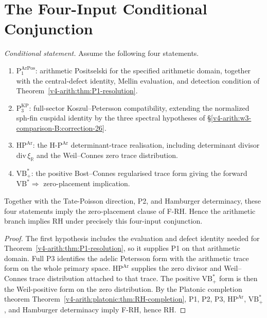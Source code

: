\section{The Four-Input Conditional Conjunction}
\label{v4-arith:w3-comparison-B:four-input-branch}

\begin{theorem}
\label{v4-arith:w3-comparison-B:thm:four-input-branch}
\emph{Conditional statement.} Assume the following four
statements.
\begin{enumerate}
\item \(\mathrm{P}_{1}^{\mathrm{ArPos}}\): arithmetic Positselski for
the specified arithmetic domain, together with the central-defect
identity, Mellin evaluation, and detection condition of
Theorem~\ref{v4-arith:thm:P1-resolution}.
\item \(\mathrm{P}_{3}^{\mathrm{KP}}\): full-sector
Koszul--Petersson compatibility, extending the normalized sph-fin
cuspidal identity by the three spectral hypotheses of
\S\ref{v4-arith:w3-comparison-B:correction-26}.
\item \(\mathrm{HP}^{\mathrm{Ar}}\): the
\(\mathrm{H}\text{-}\mathrm{P}^{\mathrm{Ar}}\) determinant-trace realisation,
including determinant divisor \(\mathrm{div}\,\xi_{\mathbb R}\) and
the Weil--Connes zero trace distribution.
\item \(\mathrm{VB}^{*}_{+}\): the positive Bost--Connes
regularised trace form giving the forward
\(\mathrm{VB}^{*}\Rightarrow\) zero-placement implication.
\end{enumerate}
Together with the Tate-Poisson direction, P2, and Hamburger
determinacy, these four statements imply the zero-placement clause of
F-RH.  Hence the arithmetic branch implies RH under precisely this
four-input conjunction.
\end{theorem}

\begin{proof}
The first hypothesis includes the evaluation and defect identity
needed for Theorem~\ref{v4-arith:thm:P1-resolution}, so it supplies
P1 on that arithmetic domain.  Full P3 identifies the adelic
Petersson form with the arithmetic trace form on the whole primary
space.  \(\mathrm{HP}^{\mathrm{Ar}}\) supplies the zero divisor and
Weil--Connes trace distribution attached to that trace.  The positive
\(\mathrm{VB}^{*}_{+}\) form is then the Weil-positive form on the zero
distribution.  By the Platonic completion theorem
Theorem~\ref{v4-arith:platonic:thm:RH-completion}, P1, P2, P3,
\(\mathrm{HP}^{\mathrm{Ar}}\), \(\mathrm{VB}^{*}_{+}\), and Hamburger
determinacy imply F-RH, hence RH.
\end{proof}

